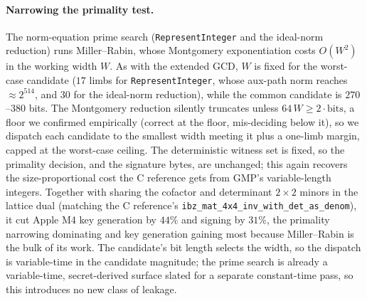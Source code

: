 \paragraph{Narrowing the primality test.}
The norm-equation prime search (\texttt{RepresentInteger} and the
ideal-norm reduction) runs Miller--Rabin, whose Montgomery exponentiation
costs $O(W^2)$ in the working width $W$.  As with the extended GCD, $W$ is
fixed for the worst-case candidate ($17$ limbs for \texttt{RepresentInteger},
whose aux-path norm reaches $\approx 2^{514}$, and $30$ for the ideal-norm
reduction), while the common candidate is $270$--$380$ bits.  The Montgomery
reduction silently truncates unless $64\,W \ge 2\cdot\mathrm{bits}$, a floor
we confirmed empirically (correct at the floor, mis-deciding below it), so
we dispatch each candidate to the smallest width meeting it plus a one-limb
margin, capped at the worst-case ceiling.  The deterministic witness set is
fixed, so the primality decision, and the signature bytes, are unchanged;
this again recovers the size-proportional cost the C reference gets from
GMP's variable-length integers.  Together with sharing the cofactor and
determinant $2\times 2$ minors in the lattice dual (matching the C
reference's \texttt{ibz\_mat\_4x4\_inv\_with\_det\_as\_denom}), it cut Apple
M4 key generation by $44\%$ and signing by $31\%$, the primality narrowing
dominating and key generation gaining most because Miller--Rabin is the bulk
of its work.  The candidate's bit length selects the width, so the dispatch
is variable-time in the candidate magnitude; the prime search is already a
variable-time, secret-derived surface slated for a separate constant-time
pass, so this introduces no new class of leakage.

